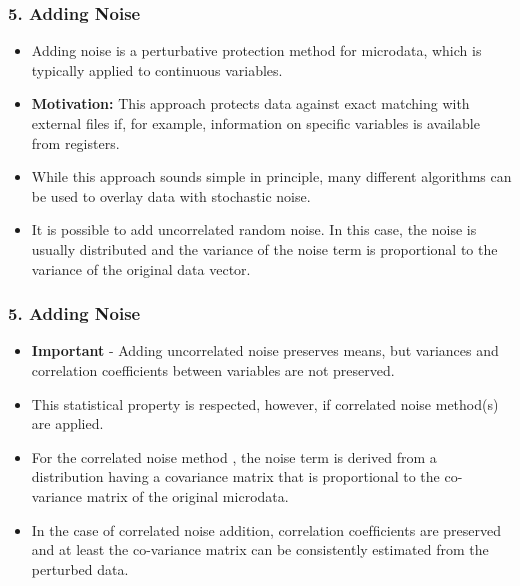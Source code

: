 \documentclass{beamer}
\begin{document}
\begin{frame}
	\frametitle{5. Adding Noise}
	\begin{itemize}
		
		\item Adding noise is a perturbative protection method for microdata, which is typically
		applied to continuous variables. 
		\item \textbf{Motivation:} This approach protects data against exact matching with external files if, for example, information on specific variables is available
		from registers.
		
		\item While this approach sounds simple in principle, many different algorithms can
		be used to overlay data with stochastic noise. 
		\item It is possible to add uncorrelated
		random noise. In this case, the noise is usually distributed and the variance of
		the noise term is proportional to the variance of the original data vector. 
	\end{itemize}
\end{frame}
\begin{frame}
	\frametitle{5. Adding Noise}
	\begin{itemize}
		\item \textbf{Important} - Adding
		uncorrelated noise preserves means, but variances and correlation coefficients between variables are not preserved.
		\item This statistical property is respected, however,
		if correlated noise method(s) are applied.
		
		\item For the correlated noise method , the noise term is derived from a
		distribution having a covariance matrix that is proportional to the co-variance matrix of the original microdata. 
		\item In the case of correlated noise addition, correlation
		coefﬁcients are preserved and at least the co-variance matrix can be consistently
		estimated from the perturbed data. 
	\end{itemize}
\end{frame}
\end{document}
